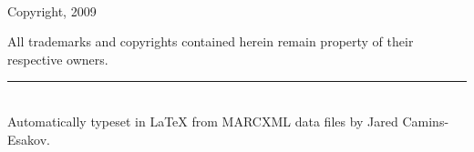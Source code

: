 {\small
~\\[4cm]

\begin{center}
Copyright, 2009\\[2cm]
\end{center}

\begin{flushleft}
All trademarks and copyrights contained herein remain property of their respective owners.

\vfill

\rule{6cm}{0.25mm}\\[0.2cm]
Automatically typeset in {\LaTeX} from MARCXML data files by Jared Camins-Esakov.
\end{flushleft}
}
